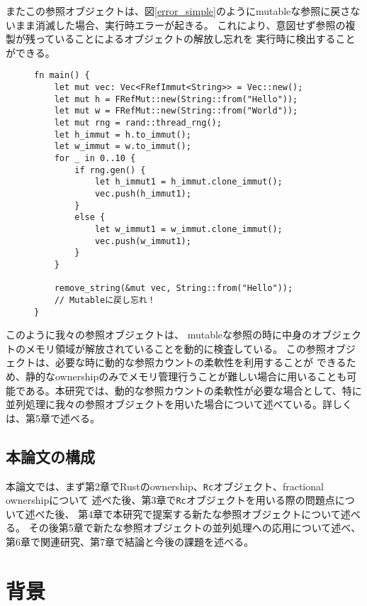 \documentclass{sumiilab-paper}
\theoremstyle{mystyle}
\numberwithin{definition}{chapter} %
\begin{document}
またこの参照オブジェクトは、図\ref{error_simple}のようにmutableな参照に戻さないまま消滅した場合、実行時エラーが起きる。
これにより、意図せず参照の複製が残っていることによるオブジェクトの解放し忘れを
実行時に検出することができる。

\begin{figure}[htp]
\begin{lstlisting}[caption=メモリリークを検出する例, 
  label=error_simple, captionpos=b]
fn main() {
    let mut vec: Vec<FRefImmut<String>> = Vec::new();
    let mut h = FRefMut::new(String::from("Hello"));
    let mut w = FRefMut::new(String::from("World"));
    let mut rng = rand::thread_rng();
    let h_immut = h.to_immut();
    let w_immut = w.to_immut();
    for _ in 0..10 {
        if rng.gen() {
            let h_immut1 = h_immut.clone_immut();
            vec.push(h_immut1);
        }
        else {
            let w_immut1 = w_immut.clone_immut();
            vec.push(w_immut1);
        }
    }

    remove_string(&mut vec, String::from("Hello"));
    // Mutableに戻し忘れ！
}
\end{lstlisting}
\end{figure}

このように我々の参照オブジェクトは、
mutableな参照の時に中身のオブジェクトのメモリ領域が解放されていることを動的に検査している。
この参照オブジェクトは、必要な時に動的な参照カウントの柔軟性を利用することが
できるため、静的なownershipのみでメモリ管理行うことが難しい場合に用いることも可能である。本研究では、動的な参照カウントの柔軟性が必要な場合として、特に並列処理に我々の参照オブジェクトを用いた場合について述べている。詳しくは、第5章で述べる。

\section{本論文の構成}
本論文では、まず第2章でRustのownership、\texttt{Rc}オブジェクト、fractional ownershipについて
述べた後、第3章で\texttt{Rc}オブジェクトを用いる際の問題点について述べた後、
第4章で本研究で提案する新たな参照オブジェクトについて述べる。
その後第5章で新たな参照オブジェクトの並列処理への応用について述べ、
第6章で関連研究、第7章で結論と今後の課題を述べる。


\chapter{背景}
\end{document}
